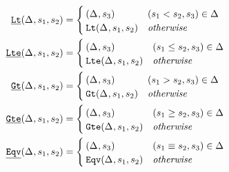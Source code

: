 \newcommand{\wrappedprimspacer}{\mbox{\hspace{1.8cm}} & \\[-3ex]}
\centering
\begin{align*}
  \pwrap{\plt}(\aStore{},s_1,s_2) &=
                                     \begin{cases}
                                       \wrappedprimspacer
                                       (\aStore{},s_3) & (s_1 < s_2, s_3) \in \aStore{} \\
                                       \plt(\aStore{},s_1,s_2) & \mathit{otherwise}
                                     \end{cases} \\
  \pwrap{\plte}(\aStore{},s_1,s_2) &=
                                     \begin{cases}
                                       \wrappedprimspacer
                                       (\aStore{},s_3) & (s_1 \leq s_2, s_3) \in \aStore{} \\
                                       \plte(\aStore{},s_1,s_2) & \mathit{otherwise}
                                     \end{cases} \\
  \pwrap{\pgt}(\aStore{},s_1,s_2) &=
                                     \begin{cases}
                                       \wrappedprimspacer
                                       (\aStore{},s_3) & (s_1 > s_2, s_3) \in \aStore{} \\
                                       \pgt(\aStore{},s_1,s_2) & \mathit{otherwise}
                                     \end{cases} \\
  \pwrap{\pgte}(\aStore{},s_1,s_2) &=
                                    \begin{cases}
                                      \wrappedprimspacer
                                      (\aStore{},s_3) & (s_1 \geq s_2, s_3) \in \aStore{} \\
                                      \pgte(\aStore{},s_1,s_2) & \mathit{otherwise}
                                    \end{cases} \\
  \pwrap{\peq}(\aStore{},s_1,s_2) &=
                                     \begin{cases}
                                       \wrappedprimspacer
                                       (\aStore{},s_3) & (s_1 \equiv s_2, s_3) \in \aStore{} \\
                                       \peq(\aStore{},s_1,s_2) & \mathit{otherwise}
                                     \end{cases} \\
\end{align*}
